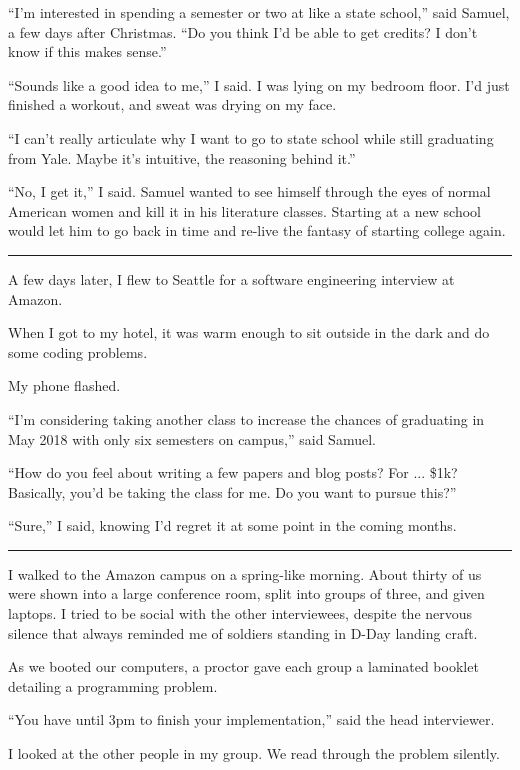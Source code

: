 ``I'm interested in spending a semester or two at like a state school,'' said
Samuel, a few days after Christmas.  ``Do you think I'd be able to get credits?
I don't know if this makes sense.''

``Sounds like a good idea to me,'' I said.  I was lying on my bedroom floor.
I'd just finished a workout, and sweat was drying on my face.  

``I can't really articulate why I want to go to state school while still
graduating from Yale.   Maybe it's intuitive, the reasoning behind it.'' 

``No, I get it,'' I said.  Samuel wanted to see himself through the eyes of
normal American women and kill it in his literature classes.  Starting at a new
school would let him to go back in time and re-live the fantasy of starting
college again.  

\plainfancybreak{12pt}{2}{* * *}

A few days later, I flew to Seattle for a software engineering interview at
Amazon.

When I got to my hotel, it was warm enough to sit outside in the dark and do
some coding problems.

My phone flashed.

``I'm considering taking another class to increase the chances of graduating in
May 2018 with only six semesters on campus,'' said Samuel.  

``How do you feel about writing a few papers and blog posts?  For ... \$1k?
Basically, you'd be taking the class for me.  Do you want to pursue this?'' 

``Sure,'' I said, knowing I'd regret it at some point in the coming months.

\plainfancybreak{12pt}{2}{* * *}

I walked to the Amazon campus on a spring-like morning.  About thirty of us were
shown into a large conference room, split into groups of three, and given
laptops.  I tried to be social with the other interviewees, despite the nervous
silence that always reminded me of soldiers standing in D-Day landing craft.

As we booted our computers, a proctor gave each group a laminated booklet
detailing a programming problem. 

``You have until 3pm to finish your implementation,'' said the head interviewer.

I looked at the other people in my group.  We read through the problem silently.

